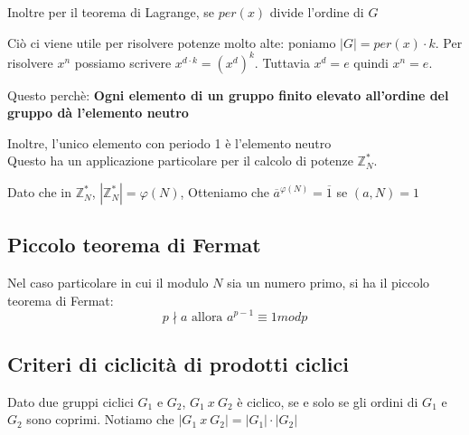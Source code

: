 \documentclass[a4paper, 10pt]{article}
\begin{document}
Inoltre per il teorema di Lagrange, se $per(x)$ divide l'ordine di $G$

Ciò ci viene utile per risolvere potenze molto alte: poniamo $|G| = per(x) \cdot k$. Per risolvere $x^n$ possiamo scrivere $x^{d \cdot k} = (x^d)^k$. Tuttavia $x^d=e$ quindi $x^n=e$.

Questo perchè: \textbf{Ogni elemento di un gruppo finito elevato all'ordine del gruppo dà l'elemento neutro}

Inoltre, l'unico elemento con periodo 1 è l'elemento neutro
\\

Questo ha un applicazione particolare per il calcolo di potenze $\mathbb{Z}_N^*$.

Dato che in $\mathbb{Z}_N^*$, $|\mathbb{Z}_N^*| = \varphi(N)$, Otteniamo che $\overline{a}^{\varphi(N)} = \overline{1}$ se $(a,N) = 1$

\subsection{Piccolo teorema di Fermat}

Nel caso particolare in cui il modulo $N$ sia un numero primo, si ha il piccolo teorema di Fermat: $$p \nmid a \text { allora } a^{p-1} \equiv 1 mod p$$
\subsection{Criteri di ciclicità di prodotti ciclici}

Dato due gruppi ciclici $G_1$ e $G_2$, $G_1\ x\ G_2$ è ciclico, se e solo se gli ordini di $G_1$ e $G_2$ sono coprimi.
Notiamo che $|G_1\ x\ G_2| = |G_1| \cdot |G_2|$
\end{document}
